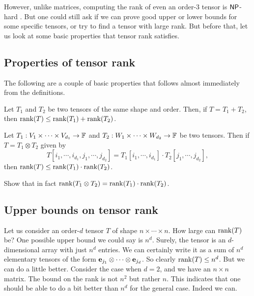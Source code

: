 However, unlike matrices, computing the rank of even an order-$3$ tensor is $\mathsf{NP}$-hard \cite{h90}.
But one could still ask if we can prove good upper or lower bounds for some specific tensors, or try to find a tensor with large rank.
But before that, let us look at some basic properties that tensor rank satisfies.

\subsection*{Properties of  tensor rank}

The following are a couple of basic properties that follows almost immediately from the definitions.

\begin{lemma}\label{lem:tensor-subadditivity}
  Let $T_1$ and $T_2$ be two tensors of the same shape and order.
Then, if $T = T_1 + T_2$, then $\operatorname{rank}(T) \leq \operatorname{rank}(T_1) + \operatorname{rank}(T_2)$.
\end{lemma}

\begin{lemma}\label{lem:tensor-submultiplicativity}
  Let $T_1: V_1 \times \cdots \times V_{d_1} \rightarrow \mathbb{F}$ and $T_2: W_1 \times \cdots \times W_{d_2} \rightarrow \mathbb{F}$ be two tensors.
Then if $T = T_1 \otimes T_2$ given by
\[
T[i_1,\cdots, i_{d_1},j_1,\cdots, j_{d_2}] = T_1[i_1,\cdots, i_{d_1}] \cdot T_2[j_1,\cdots, j_{d_2}],
\]
then $\operatorname{rank}(T) \leq \operatorname{rank}(T_1) \cdot \operatorname{rank}(T_2)$. 
\end{lemma}

\begin{exercise}
  Show that in fact $\operatorname{rank}(T_1 \otimes T_2) = \operatorname{rank}(T_1) \cdot \operatorname{rank}(T_2)$.
\end{exercise}

\subsection{Upper bounds on tensor rank}

Let us consider an order-$d$ tensor $T$ of shape $n \times \cdots \times n$.
How large can $\operatorname{rank}(T)$ be?
One possible upper bound we could say is $n^d$.
Surely, the tensor is an $d$-dimensional array with just $n^d$ entries.
We can certainly write it as a sum of $n^d$ elementary tensors of the form $\mathbf{e}_{j_1} \otimes \cdots \otimes \mathbf{e}_{j_d}$.
So clearly $\operatorname{rank}(T) \leq n^d$.
But we can do a little better.
Consider the case when $d=2$, and we have an $n\times n$ matrix.
The bound on the rank is not $n^2$ but rather $n$.
This indicates that one should be able to do a bit better than $n^d$ for the general case.
Indeed we can.

